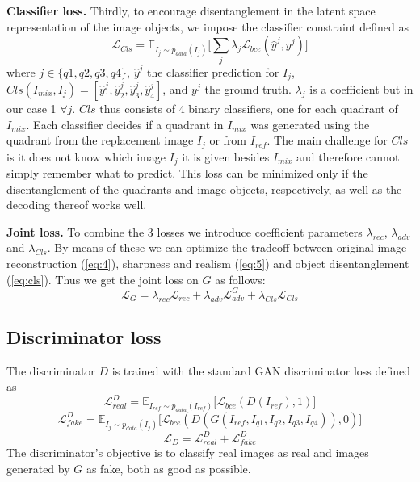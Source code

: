 \documentclass[a4paper,12pt]{report}
\begin{document}
\textbf{Classifier loss.} Thirdly, to encourage disentanglement in the latent space representation of the image objects, we impose the classifier constraint defined as
\begin{equation} \label{eq:cls}
    \mathcal{L}_{Cls} = \mathbb{E}_{I_{j}\sim p_{data} (I_{j})}\big[\sum_{j} \lambda_j \mathcal{L}_{bce}(\hat{y}^j, y^j)\big]
\end{equation}
where $j \in \{q1,q2,q3,q4\}$, $\hat{y}^j$ the classifier prediction for $I_j$, $Cls(I_{mix}, I_j) = [\hat{y}^j_1, \hat{y}^j_2, \hat{y}^j_3, \hat{y}^j_4]$, and $y^j$ the ground truth. $\lambda_j$ is a coefficient but in our case 1 $\forall j$. $Cls$ thus consists of 4 binary classifiers, one for each quadrant of $I_{mix}$. Each classifier decides if a quadrant in $I_{mix}$ was generated using the quadrant from the replacement image $I_j$ or from $I_{ref}$. The main challenge for $Cls$ is it does not know which image $I_j$ it is given besides $I_{mix}$ and therefore cannot simply remember what to predict. This loss can be minimized only if the disentanglement of the quadrants and image objects, respectively, as well as the decoding thereof works well.

\textbf{Joint loss.} To combine the 3 losses we introduce coefficient parameters $\lambda_{rec}$, $\lambda_{adv}$ and $\lambda_{Cls}$. By means of these we can optimize the tradeoff between original image reconstruction (\ref{eq:4}), sharpness and realism (\ref{eq:5}) and object disentanglement (\ref{eq:cls}). Thus we get the joint loss on $G$ as follows:
\begin{equation} \label{eq:g_loss_comp}
    \mathcal{L}_{G} = \lambda_{rec} \mathcal{L}_{rec} + \lambda_{adv} \mathcal{L}^G_{adv} + \lambda_{Cls} \mathcal{L}_{Cls}
\end{equation}

\subsection{Discriminator loss}
The discriminator $D$ is trained with the standard GAN discriminator loss defined as
\begin{equation} \label{eq:lorbms_D_real}
    \mathcal{L}^D_{real} = \mathbb{E}_{I_{ref}\sim p_{data} (I_{ref})}\big[ \mathcal{L}_{bce}(D(I_{ref}), 1)\big]
\end{equation}
\begin{equation} \label{eq:lorbms_D_fake}
    \mathcal{L}^D_{fake} =  \mathbb{E}_{I_{j}\sim p_{data} (I_{j})}\big[ \mathcal{L}_{bce}(D(G(I_{ref},I_{q1},I_{q2},I_{q3},I_{q4})), 0)\big]
\end{equation}
\begin{equation} \label{eq:lorbms_D}
    \mathcal{L}_{D} = \mathcal{L}^D_{real} + \mathcal{L}^D_{fake}
\end{equation}
The discriminator's objective is to classify real images as real and images generated by $G$ as fake, both as good as possible.
\end{document}
